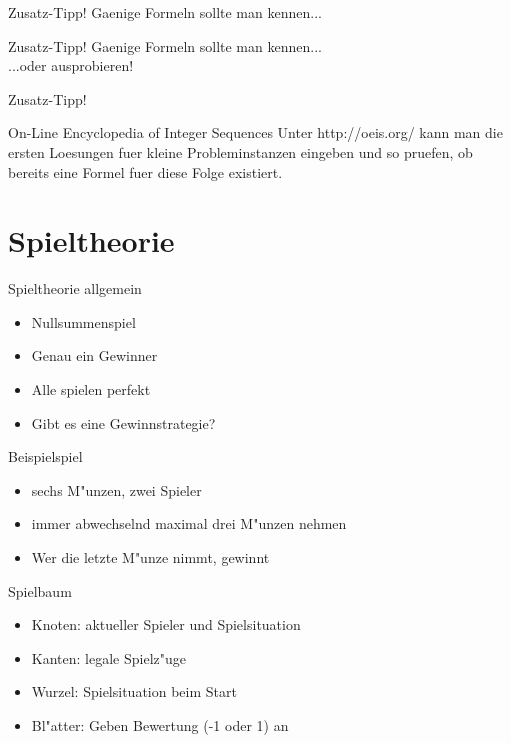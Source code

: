 \documentclass[18pt]{beamer}
\begin{document}
\begin{frame}{Zusatz-Tipp!}
Gaenige Formeln sollte man kennen... \\

\end{frame}

\begin{frame}{Zusatz-Tipp!}
Gaenige Formeln sollte man kennen... \\



...oder ausprobieren! \\

\end{frame}

\begin{frame}{Zusatz-Tipp!}
\begin{block}{On-Line Encyclopedia of Integer Sequences}
Unter http://oeis.org/ kann man die ersten Loesungen fuer kleine Probleminstanzen eingeben und so pruefen, ob bereits eine Formel fuer diese Folge existiert.
\end{block}

\end{frame}


\section{Spieltheorie}
\begin{frame}{Spieltheorie allgemein}
\begin{itemize}
\item Nullsummenspiel
\pause
\item Genau ein Gewinner
\pause
\item Alle spielen perfekt
\pause
\item Gibt es eine Gewinnstrategie?
\end{itemize}
\end{frame}

\begin{frame}{Beispielspiel}
\begin{itemize}
\item sechs M"unzen, zwei Spieler
\pause
\item immer abwechselnd maximal drei M"unzen nehmen
\pause
\item Wer die letzte M"unze nimmt, gewinnt
\end{itemize}
\end{frame}

\begin{frame}{Spielbaum}
\begin{itemize}
\item Knoten: aktueller Spieler und Spielsituation
\pause
\item Kanten: legale Spielz"uge
\pause
\item Wurzel: Spielsituation beim Start
\pause
\item Bl"atter: Geben Bewertung (-1 oder 1) an
\pause
\end{itemize}
\end{frame}
\end{document}
